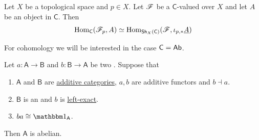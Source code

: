 \documentclass[../main.tex]{subfiles}
\begin{document}
\begin{corollary}\label{cor:stalk-constant-adjunction-presheaf}
  Let \(X\) be a topological space and \(p \in X\).
  Let \(\mathscr{F}\) be a \(\mathsf{C}\)-valued  over \(X\) and let \(A\) be an object in \(\mathsf{C}\).
  Then
  \begin{equation*}
    \operatorname{Hom}_{\mathsf{C}}(\mathscr{F}_{p}, A) \simeq \operatorname{Hom}_{\mathsf{Sh}_{X}(\mathsf{C})}(\mathscr{F}, \iota_{p, \ast}\underline{A})
  \end{equation*}
\end{corollary}


For cohomology we will be interested in the case \(\mathsf{C} = \mathsf{Ab}\).

\begin{lemma} \label{lemma:abelian-category-from-adjunction}
  Let \(a: \mathsf{A} \to \mathsf{B}\) and \(b: \mathsf{B} \to \mathsf{A}\) be two .
  Suppose that
  \begin{enumerate}
    \item \(\mathsf{A}\) and \(\mathsf{B}\) are \hyperref[def:additive-category]{additive categories}, \(a, b\) are additive functors and \(b \dashv a\).
    \item \(\mathsf{B}\) is an  and \(b\) is \hyperref[def:exact-functor]{left-exact}.
    \item \(ba \cong \id_{\mathsf{A}}\).
  \end{enumerate}
  Then \(\mathsf{A}\) is abelian.
\end{lemma}
\end{document}
